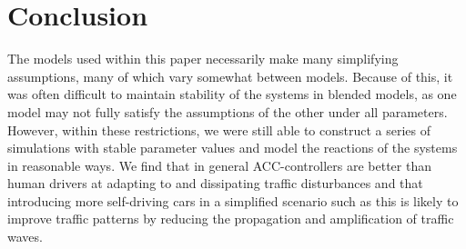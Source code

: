 \documentclass[12pt]{article}
\begin{document}
\section{Conclusion}
The models used within this paper necessarily make many simplifying assumptions, many of which vary somewhat between models. Because of this, it was often difficult to maintain stability of the systems in blended models, as one model may not fully satisfy the assumptions of the other under all parameters. However, within these restrictions, we were still able to construct a series of simulations with stable parameter values and model the reactions of the systems in reasonable ways. We find that in general ACC-controllers are better than human drivers at adapting to and dissipating traffic disturbances and that introducing more self-driving cars in a simplified scenario such as this is likely to improve traffic patterns by reducing the propagation and amplification of traffic waves. 



\newpage



\end{document}
